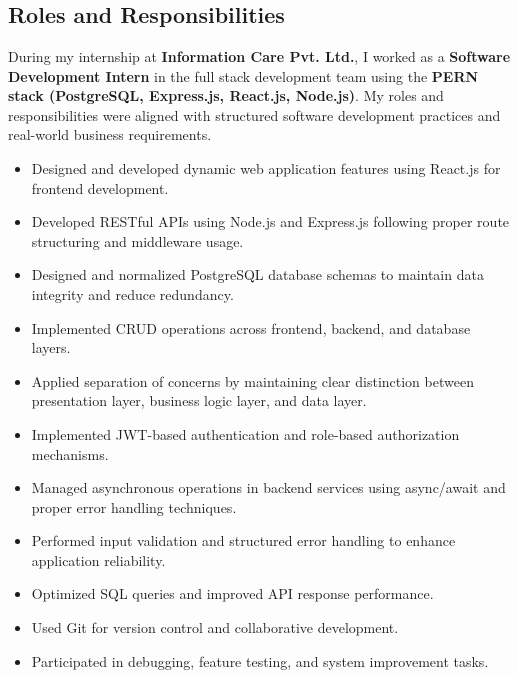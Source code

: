 \section*{\Large{}}
\label{3}

\subsection{Roles and Responsibilities}

During my internship at \textbf{Information Care Pvt. Ltd.}, I worked as a \textbf{Software Development Intern} in the full stack development team using the \textbf{PERN stack (PostgreSQL, Express.js, React.js, Node.js)}. My roles and responsibilities were aligned with structured software development practices and real-world business requirements.

\begin{itemize}

    \item Designed and developed dynamic web application features using React.js for frontend development.
    
    \item Developed RESTful APIs using Node.js and Express.js following proper route structuring and middleware usage.
    
    \item Designed and normalized PostgreSQL database schemas to maintain data integrity and reduce redundancy.
    
    \item Implemented CRUD operations across frontend, backend, and database layers.
    
    \item Applied separation of concerns by maintaining clear distinction between presentation layer, business logic layer, and data layer.
    
    \item Implemented JWT-based authentication and role-based authorization mechanisms.
    
    \item Managed asynchronous operations in backend services using async/await and proper error handling techniques.
    
    \item Performed input validation and structured error handling to enhance application reliability.
    
    \item Optimized SQL queries and improved API response performance.
    
    \item Used Git for version control and collaborative development.
    
    \item Participated in debugging, feature testing, and system improvement tasks.
    

    
\end{itemize}

